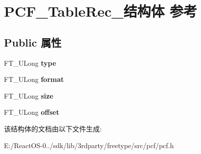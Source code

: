 \hypertarget{struct_p_c_f___table_rec__}{}\section{P\+C\+F\+\_\+\+Table\+Rec\+\_\+结构体 参考}
\label{struct_p_c_f___table_rec__}
\subsection*{Public 属性}
\begin{DoxyCompactItemize}
\item 
\mbox{\label{struct_p_c_f___table_rec___ada89100bef8a0e316501e9a07dbfc45d}} 
F\+T\+\_\+\+U\+Long {\bfseries type}
\item 
\mbox{\label{struct_p_c_f___table_rec___a212d6854709410db70c12671da5c282b}} 
F\+T\+\_\+\+U\+Long {\bfseries format}
\item 
\mbox{\label{struct_p_c_f___table_rec___a6a340dbfbed9846071a730ce76dd8881}} 
F\+T\+\_\+\+U\+Long {\bfseries size}
\item 
\mbox{\label{struct_p_c_f___table_rec___a6b77ef2cf8a89a1a709f12aae718fff9}} 
F\+T\+\_\+\+U\+Long {\bfseries offset}
\end{DoxyCompactItemize}


该结构体的文档由以下文件生成\+:\begin{DoxyCompactItemize}
\item 
E\+:/\+React\+O\+S-\/0../sdk/lib/3rdparty/freetype/src/pcf/pcf.\+h\end{DoxyCompactItemize}
